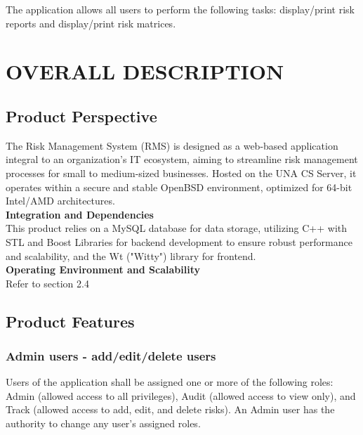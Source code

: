 \documentclass[letterpaper,12pt,oneside,listof=totoc]{scrreprt}
\begin{document}
\noindent The application allows all users to perform the following tasks: display/print risk reports and display/print risk matrices.




\chapter{OVERALL DESCRIPTION}

\section{Product Perspective}
    The Risk Management System (RMS) is designed as a web-based application integral to an organization's IT ecosystem, aiming to streamline risk management processes for small to medium-sized businesses. Hosted on the UNA CS Server, it operates within a secure and stable OpenBSD environment, optimized for 64-bit Intel/AMD architectures.\\

\textbf{Integration and Dependencies}\\
    This product relies on a MySQL database for data storage, utilizing C++ with STL and Boost Libraries for backend development to ensure robust performance and scalability, and the Wt ("Witty") library for frontend.\\

\textbf{Operating Environment and Scalability}\\
    Refer to section 2.4

\section{Product Features}
 \subsection{Admin users - add/edit/delete users}
Users of the application shall be assigned one or more of the following roles: Admin (allowed access to all privileges), Audit (allowed access to view only), and Track (allowed access to add, edit, and delete risks). An Admin user has the authority to change any user's assigned roles.
\end{document}
